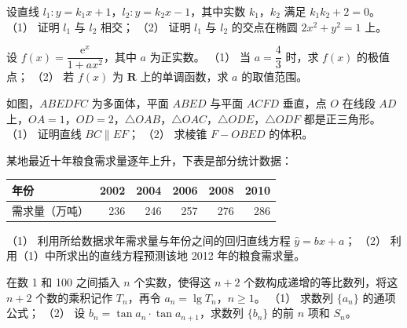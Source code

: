 \begin{question}
设直线 $l_1:y=k_1x+1$，$l_2:y=k_2x-1$，其中实数 $k_1$，$k_2$ 满足 $k_1k_2+2=0$。
（1） 证明 $l_1$ 与 $l_2$ 相交；
（2） 证明 $l_1$ 与 $l_2$ 的交点在椭圆 $2x^2+y^2=1$ 上。
\end{question}
\begin{question}
设 $f(x)=\dfrac{\mathrm e^x}{1+ax^2}$，其中 $a$ 为正实数。
（1） 当 $a=\dfrac43$ 时，求 $f(x)$ 的极值点；
（2） 若 $f(x)$ 为 $\mathbf R$ 上的单调函数，求 $a$ 的取值范围。
\Needspace{0.4\textheight}
\end{question}
\begin{question}
如图，$ABEDFC$ 为多面体，平面 $ABED$ 与平面 $ACFD$ 垂直，点 $O$ 在线段 $AD$ 上，$OA=1$，$OD=2$，$\triangle OAB$，$\triangle OAC$，$\triangle ODE$，$\triangle ODF$ 都是正三角形。
（1） 证明直线 $BC\parallel EF$；
（2） 求棱锥 $F-OBED$ 的体积。
\nopagebreak[4]
\begin{center}\end{center}
\nopagebreak[4]
\end{question}
\begin{question}
某地最近十年粮食需求量逐年上升，下表是部分统计数据：

\begin{center}
\begin{tabular}{lrrrrr}
\toprule
年份 & 2002 & 2004 & 2006 & 2008 & 2010 \\
\midrule
需求量（万吨） & 236 & 246 & 257 & 276 & 286 \\
\bottomrule
\end{tabular}
\end{center}

（1） 利用所给数据求年需求量与年份之间的回归直线方程 $\hat y=bx+a$；
（2） 利用（1）中所求出的直线方程预测该地 2012 年的粮食需求量。
\end{question}
\begin{question}
在数 1 和 100 之间插入 $n$ 个实数，使得这 $n+2$ 个数构成递增的等比数列，将这 $n+2$ 个数的乘积记作 $T_n$，再令 $a_n=\lg T_n$，$n\geqslant1$。
（1） 求数列 $\{a_n\}$ 的通项公式；
（2） 设 $b_n=\tan a_n\cdot\tan a_{n+1}$，求数列 $\{b_n\}$ 的前 $n$ 项和 $S_n$。

\end{question}
